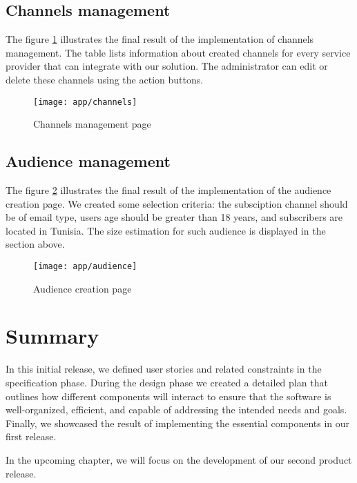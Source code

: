 \subsection{Channels management}
The figure \ref{ss-channels} illustrates the final result of the implementation of channels management. The table
lists information about created channels for every service provider that can integrate with our solution. The
administrator can edit or delete these channels using the action buttons.
\begin{figure}[hbt!]
    \centering
    \texttt{[image: app/channels]}
    \caption{Channels management page}
    \label{ss-channels}
\end{figure}

\subsection{Audience management}
The figure \ref{ss-audience} illustrates the final result of the implementation of the audience creation page.
We created some selection criteria: the subsciption channel should be of email type, users age should be greater
than 18 years, and subscribers are located in Tunisia. The size estimation for such audience is displayed in the section above.
\begin{figure}[hbt!]
    \centering
    \texttt{[image: app/audience]}
    \caption{Audience creation page}
    \label{ss-audience}
\end{figure}


\section*{Summary}

In this initial release, we defined user stories and related constraints in the specification phase.
During the design phase we created a detailed plan that outlines how different components will interact to
ensure that the software is well-organized, efficient, and capable of addressing the intended needs and
goals. Finally, we showcased the result of implementing the essential components in our first release.

\noindent In the upcoming chapter, we will focus on the development of our second product release.